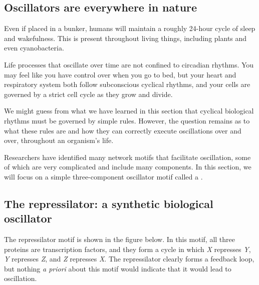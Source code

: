 \subsection{Oscillators are everywhere in nature}

Even if placed in a bunker, humans will maintain a roughly 24-hour cycle of sleep and wakefulness. This  is present throughout living things, including plants and even cyanobacteria.

Life processes that oscillate over time are not confined to circadian rhythms. You may feel like you have control over when you go to bed, but your heart and respiratory system both follow subconscious cyclical rhythms, and your cells are governed by a strict cell cycle as they grow and divide.

We might guess from what we have learned in this section that cyclical biological rhythms must be governed by simple rules. However, the question remains as to what these rules are and how they can correctly execute oscillations over and over, throughout an organism's life.

Researchers have identified many network motifs that facilitate oscillation, some of which are very complicated and include many components. In this section, we will focus on a simple three-component oscillator motif called a .

\FloatBarrier
{}
\subsection{The repressilator: a synthetic biological oscillator}

The repressilator motif is shown in the figure below. In this motif, all three proteins are transcription factors, and they form a cycle in which \textit{X} represses \textit{Y}, \textit{Y} represses \textit{Z}, and \textit{Z} represses \textit{X}. The repressilator clearly forms a feedback loop, but nothing \textit{a priori} about this motif would indicate that it would lead to oscillation.

